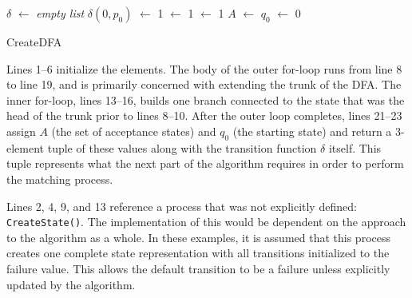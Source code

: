 \IncMargin{1em}
\begin{algorithm}[ht]
  \DontPrintSemicolon

  \BlankLine
  $\delta$ $\leftarrow$ \textit{empty list}\;
  \;
  $\delta(0, p_0)$ $\leftarrow$ 1\;
  \;
  \State $\leftarrow$ 1\;
  \NewState $\leftarrow$ 1\;
  $A$ $\leftarrow$ \State\;
  $q_0$ $\leftarrow$ 0\;
\caption{CreateDFA}
\label{alg:create_dfa}
\end{algorithm}
\DecMargin{1em}

Lines 1--6 initialize the elements. The body of the outer for-loop runs from line 8 to line 19, and is primarily concerned with extending the trunk of the DFA. The inner for-loop, lines 13--16, builds one branch connected to the state that was the head of the trunk prior to lines 8--10. After the outer loop completes, lines 21--23 assign $A$ (the set of acceptance states) and $q_0$ (the starting state) and return a 3-element tuple of these values along with the transition function $\delta$ itself. This tuple represents what the next part of the algorithm requires in order to perform the matching process.

Lines 2, 4, 9, and 13 reference a process that was not explicitly defined: \texttt{CreateState()}. The implementation of this would be dependent on the approach to the algorithm as a whole. In these examples, it is assumed that this process creates one complete state representation with all transitions initialized to the failure value. This allows the default transition to be a failure unless explicitly updated by the algorithm.


